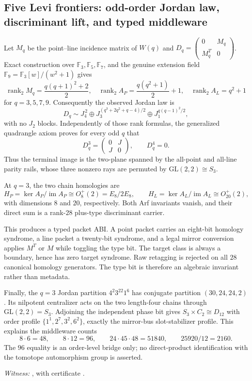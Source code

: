 \subsection{Five Levi frontiers: odd-order Jordan law, discriminant lift, and typed middleware}
\label{sec:levi-five-frontiers}

Let $M_q$ be the point--line incidence matrix of $W(q)$ and
$D_q=\left(\begin{smallmatrix}0&M_q\\M_q^T&0\end{smallmatrix}\right)$.
Exact construction over $\mathbb F_3,\mathbb F_5,\mathbb F_7$, and the genuine
extension field $\mathbb F_9=\mathbb F_3[w]/(w^2+1)$ gives
\[
\operatorname{rank}_2 M_q=\frac{q(q+1)^2+2}{2},\quad
\operatorname{rank}_2 A_P=\frac{q(q^2+1)}2+1,\quad
\operatorname{rank}_2 A_L=q^2+1
\]
for $q=3,5,7,9$.  Consequently the observed Jordan law is
\[
D_q\sim J_4^{\,2}\oplus
J_3^{(q^3+2q^2+q-4)/2}\oplus
J_1^{q(q-1)^2/2},
\]
with no $J_2$ blocks.  Independently of those rank formulas, the generalized
quadrangle axiom proves for every odd $q$ that
\[
D_q^3=\begin{pmatrix}0&J\\J&0\end{pmatrix},\qquad D_q^4=0.
\]
Thus the terminal image is the two-plane spanned by the all-point and all-line
parity rails, whose three nonzero rays are permuted by
$\mathrm{GL}(2,2)\cong S_3$.

At $q=3$, the two chain homologies are
\[
H_P=\ker A_P/\operatorname{im}A_P\cong O_8^+(2)=E_8/2E_8,
\qquad
H_L=\ker A_L/\operatorname{im}A_L\cong O_{20}^+(2),
\]
with dimensions $8$ and $20$, respectively.  Both Arf invariants vanish, and
their direct sum is a rank-$28$ plus-type discriminant carrier.

This produces a typed packet ABI.  A point packet carries an eight-bit homology
syndrome, a line packet a twenty-bit syndrome, and a legal mirror conversion
applies $M^T$ or $M$ while toggling the type bit.  The target class is always a
boundary, hence has zero target syndrome.  Raw retagging is rejected on all
$28$ canonical homology generators.  The type bit is therefore an algebraic
invariant rather than metadata.

Finally, the $q=3$ Jordan partition $4^2 3^{22}1^6$ has conjugate partition
$(30,24,24,2)$.  Its nilpotent centralizer acts on the two length-four chains
through $\mathrm{GL}(2,2)=S_3$.  Adjoining the independent phase bit gives
$S_3\times C_2\cong D_{12}$ with order profile
$\{1^1,2^7,3^2,6^2\}$, exactly the mirror-bus slot-stabilizer profile.  This
explains the middleware counts
\[
8\cdot6=48,\qquad 8\cdot12=96,\qquad
24\cdot45\cdot48=51840,\qquad 25920/12=2160.
\]
The $96$ equality is an order-level bridge only; no direct-product
identification with the tomotope automorphism group is asserted.

\emph{Witness:}
, with certificate
.
